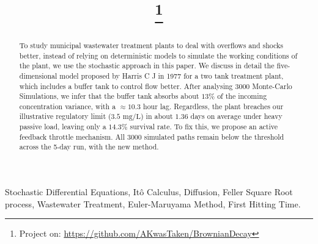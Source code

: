 \documentclass[conference]{IEEEtran}
\renewcommand{\smallskip}{\vspace{0.5\baselineskip}}
\theoremstyle{definitionsc}
\theoremstyle{plainsc}
\theoremstyle{remarksc}
\begin{document}
\title{%
  {\huge{}}\\[0.6ex]
  {\footnotesize{}}\\[-1.4ex]
  {\footnotesize{}}
  \thanks{Project on: \url{https://github.com/AKwasTaken/BrownianDecay}}
}


\author{
}

\maketitle

\begin{abstract}
To study municipal wastewater treatment plants to deal with overflows and shocks better, instead of relying on deterministic models to simulate the working conditions of the plant, we use the stochastic approach in this paper. We discuss in detail the five-dimensional model proposed by Harris C J in 1977 for a two tank treatment plant, which includes a buffer tank to control flow better. After analysing 3000 Monte-Carlo Simulations, we infer that the buffer tank absorbs about $13\%$ of the incoming concentration variance, with a $\approx 10.3$ hour lag. Regardless, the plant breaches our illustrative regulatory limit ($3.5\text{ mg/L}$) in about $1.36$ days on average under heavy passive load, leaving only a $14.3\%$ survival rate. To fix this, we propose an active feedback throttle mechanism. All $3000$ simulated paths remain below the threshold across the 5-day run, with the new method.
\end{abstract}


\smallskip

\begin{IEEEkeywords}

Stochastic Differential Equations, It\^o Calculus, Diffusion, Feller Square Root process, Wastewater Treatment, Euler-Maruyama Method, First Hitting Time.

\end{IEEEkeywords}
\end{document}
